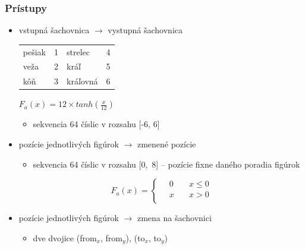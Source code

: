 \documentclass[red]{beamer}
\begin{document}
\begin{frame}
\frametitle{Prístupy} 
\begin{center}
\begin{itemize}
\item vstupná šachovnica $\rightarrow$ vystupná šachovnica

\vspace*{0.2cm}
\begin{minipage}{.5\textwidth}
\begin{center}
{\small
\begin{tabular}{| l l | l l |}
\hline
 pešiak & 1 & strelec & 4 \\
 veža & 2 & kráľ & 5 \\
 kôň & 3 & kráľovná & 6\\
\hline
\end{tabular}
}
\end{center} 
\end{minipage}%
\begin{minipage}{.5\textwidth}
$F_a(x)=12 \times tanh(\frac{x}{12})$
\end{minipage}%
\begin{itemize}
\item sekvencia 64 číslic v rozsahu [-6, 6]
\end{itemize}

\item pozície jednotlivých figúrok $ \rightarrow $ zmenené pozície

\begin{minipage}{.5\textwidth}
\begin{itemize}
\item sekvencia 64 číslic v rozsahu [0,~8] -- pozície fixne daného poradia figúrok
\end{itemize}
\end{minipage}%
\begin{minipage}{.5\textwidth}
\[ F_a(x) =
  \begin{cases}
    \quad 0  & \quad x \leq 0 \\
    \quad x  & \quad x > 0\\
  \end{cases}
\]
\end{minipage}%

\item pozície jednotlivých figúrok $ \rightarrow $ zmena na šachovnici

\begin{itemize}
\item dve dvojice (from$_x$, from$_y$), (to$_x$, to$_y$)
\end{itemize}

\end{itemize}
\end{center}
\end{frame}
\end{document}
